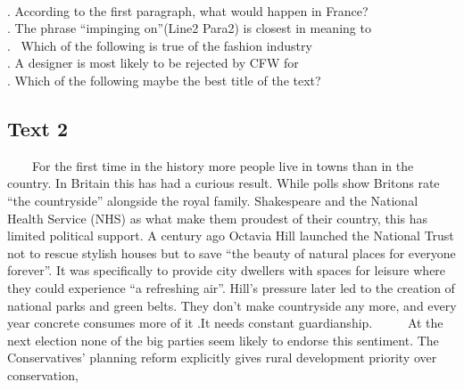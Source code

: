 　　\begin{questions} . According to the first paragraph, what would happen in France?
　　\\ . The phrase “impinging on”(Line2 Para2) is closest in meaning to
　　\\ .  Which of the following is true of the fashion industry
　　\\ . A designer is most likely to be rejected by CFW for
　　\\ . Which of the following maybe the best title of the text?
　　\\ \end{questions}      \subsection{Text 2}
　　For the first time in the history more people live in towns than in the country. In Britain this has had a curious result. While polls show Britons rate “the countryside” alongside the royal family. Shakespeare and the National Health Service (NHS) as what make them proudest of their country, this has limited political support. A century ago Octavia Hill launched the National Trust not to rescue stylish houses but to save “the beauty of natural places for everyone forever”. It was specifically to provide city dwellers with spaces for leisure where they could experience “a refreshing air”. Hill’s pressure later led to the creation of national parks and green belts. They don’t make countryside any more, and every year concrete consumes more of it .It needs constant guardianship.
 　　At the next election none of the big parties seem likely to endorse this sentiment. The Conservatives’ planning reform explicitly gives rural development priority over conservation,
